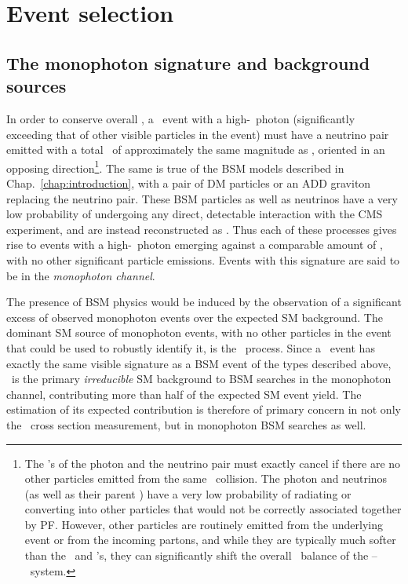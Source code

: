 \chapter{Event selection} \label{chap:event_selection}
\section{The monophoton signature and background sources} \label{sec:event_selection_backgrounds}
In order to conserve overall \pT, a \zinvg\ event with a high-\pT\ photon (significantly exceeding that of other visible particles in the event)
must have a neutrino pair emitted with a total \vecpT\ of approximately the same magnitude as \vecpTgamma, oriented in an opposing direction\footnote{The \pT's
of the photon and the neutrino pair must exactly cancel if there are no other particles emitted from the same \Pp\Pp\ collision. The photon and neutrinos (as well as
their parent \PZ) have a very low probability of radiating or converting into other particles that would not be correctly associated together by PF.
However, other particles are routinely emitted from the underlying event or from the incoming partons, and while they are typically much softer than the \Pgamma\ and
\Pn's, they can significantly shift the overall \pT\ balance of the \Pgamma--\Pn\Pn\ system.}.
The same is true of the BSM models described in Chap.~\ref{chap:introduction}, with a pair of DM particles or an ADD graviton replacing the neutrino pair.
These BSM particles as well as neutrinos have a very low probability of undergoing any direct, detectable interaction with the CMS experiment, and are instead reconstructed as \MET.
Thus each of these processes gives rise to events with a high-\pT\ photon emerging against a comparable amount of \MET, with no other significant particle emissions.
Events with this signature are said to be in the \textit{monophoton channel}.

The presence of BSM physics would be induced by the observation of a significant excess of observed monophoton events over the expected SM background.
The dominant SM source of monophoton events, with no other particles in the event that could be used to robustly identify it, is the \zinvg\ process.
Since a \zinvg\ event has exactly the same visible signature as a BSM event of the types described above, \zinvg\ is the primary \textit{irreducible} SM background
to BSM searches in the monophoton channel, contributing more than half of the expected SM event yield. The estimation of its expected contribution is therefore of
primary concern in not only the \zinvg\ cross section measurement, but in monophoton BSM searches as well.

